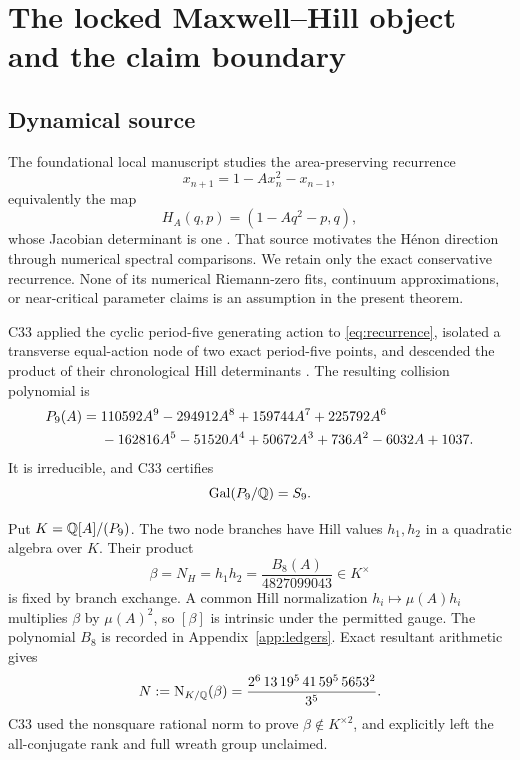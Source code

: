 \section{The locked Maxwell--Hill object and the claim boundary}

\subsection{Dynamical source}

The foundational local manuscript studies the area-preserving recurrence
\begin{equation}
 x_{n+1}=1-Ax_n^2-x_{n-1},                                 \label{eq:recurrence}
\end{equation}
equivalently the map
\begin{equation}
 H_A(q,p)=(1-Aq^2-p,q),                                    \label{eq:henon}
\end{equation}
whose Jacobian determinant is one \citep{wang2026henonmodel}.  That source
motivates the H\'enon direction through numerical spectral comparisons.  We
retain only the exact conservative recurrence.  None of its numerical
Riemann-zero fits, continuum approximations, or near-critical parameter
claims is an assumption in the present theorem.

C33 applied the cyclic period-five generating action to
\eqref{eq:recurrence}, isolated a transverse equal-action node of two exact
period-five points, and descended the product of their chronological Hill
determinants \citep{hcs2026c33note}.  The resulting collision polynomial is
\begin{align}
P_9(A)={}&110592A^9-294912A^8+159744A^7+225792A^6\notag\\
&-162816A^5-51520A^4+50672A^3+736A^2-6032A+1037. \label{eq:p9}
\end{align}
It is irreducible, and C33 certifies
\begin{equation}
 \operatorname{Gal}(P_9/\mathbb{Q})=S_9.                                         \label{eq:s9}
\end{equation}

Put \(K=\mathbb{Q}[A]/(P_9)\).  The two node branches have Hill values
\(h_1,h_2\) in a quadratic algebra over \(K\).  Their product
\begin{equation}
 \beta=N_H=h_1h_2=\frac{B_8(A)}{4827099043}\in K^\times    \label{eq:beta}
\end{equation}
is fixed by branch exchange.  A common Hill normalization
\(h_i\mapsto\mu(A)h_i\) multiplies \(\beta\) by \(\mu(A)^2\), so
\([\beta]\) is intrinsic under the permitted gauge.  The polynomial
\(B_8\) is recorded in Appendix~\ref{app:ledgers}.  Exact resultant
arithmetic gives
\begin{equation}
N:=\operatorname{N}_{K/\mathbb{Q}}(\beta)
=\frac{2^6\,13\,19^5\,41\,59^5\,5653^2}{3^5}.             \label{eq:norm}
\end{equation}
C33 used the nonsquare rational norm to prove \(\beta\notin K^{\times2}\),
and explicitly left the all-conjugate rank and full wreath group unclaimed.

